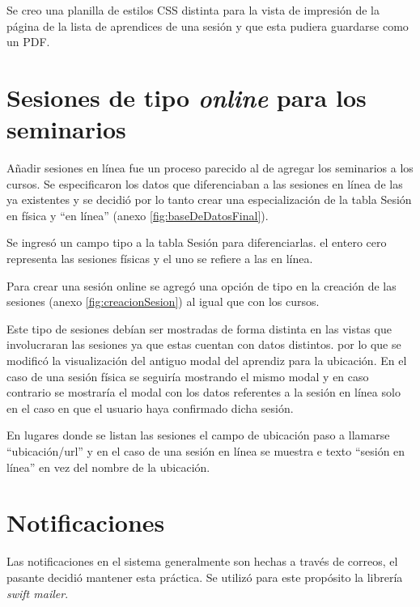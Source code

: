 	Se creo una planilla de estilos \gls{CSS} distinta para la vista de impresión de la página de la lista de aprendices de una sesión y que esta pudiera guardarse como un \gls{PDF}. 


	\section{Sesiones de tipo \emph{online} para los seminarios} %
	\label{sec:sesiones_de_seminario_tipo_}

	Añadir sesiones en línea fue un proceso parecido al de agregar los seminarios a los cursos. Se especificaron los datos que diferenciaban a las sesiones en línea de las ya existentes y se decidió por lo tanto crear una especialización de la tabla Sesión en física y ``en línea'' (anexo \ref{fig:baseDeDatosFinal}).

	Se ingresó un campo tipo a la tabla Sesión para diferenciarlas. el entero cero representa las sesiones físicas y el uno se refiere a las en línea.

	Para crear una sesión online se agregó una opción de tipo en la creación de las sesiones (anexo \ref{fig:creacionSesion}) al igual que con los cursos.

	Este tipo de sesiones debían ser mostradas de forma distinta en las vistas que involucraran las sesiones ya que estas cuentan con datos distintos. por lo que se modificó la visualización del antiguo modal del aprendiz para la ubicación. En el caso de una sesión física se seguiría mostrando el mismo modal y en caso contrario se mostraría el modal con los datos referentes a la sesión en línea solo en el caso en que el usuario haya confirmado dicha sesión.

	En lugares donde se listan las sesiones el campo de ubicación paso a llamarse ``ubicación/url'' y en el caso de una sesión en línea se muestra e texto ``sesión en línea'' en vez del nombre de la ubicación. 


	\section{Notificaciones} %
	\label{sec:notificaciones}
	
	Las notificaciones en el sistema generalmente son hechas a través de correos, el pasante decidió mantener esta práctica. Se utilizó para este propósito la librería \emph{swift mailer}.

